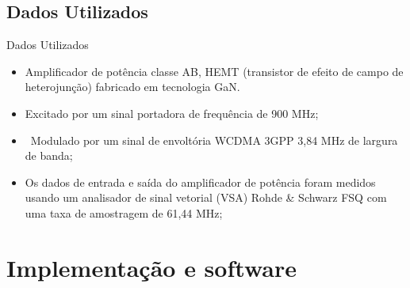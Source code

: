 \documentclass{if-beamer}
\begin{document}
\subsection{Dados Utilizados}
\begin{frame}{Dados Utilizados}
	\begin{minipage}{0.5\textwidth}
		
		
	\end{minipage}%
	\hspace{0.04\textwidth}
	\begin{minipage}{0.5\textwidth}
		\begin{itemize}
			\item Amplificador de potência classe AB, HEMT (transistor de efeito de campo de heterojunção) fabricado em tecnologia GaN.
			\item Excitado por um sinal portadora de frequência de 900	MHz;
			\item Modulado por um sinal de envoltória WCDMA 3GPP 3,84 MHz de largura de banda;
			\item Os dados de entrada e saída do amplificador de potência foram medidos usando um analisador de sinal vetorial (VSA) Rohde \& Schwarz FSQ com uma taxa de amostragem de 61,44 MHz;
		\end{itemize}
	\end{minipage}
\end{frame}

\section{Implementação e software}
\end{document}
